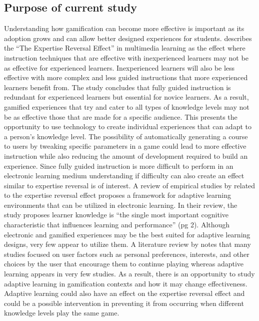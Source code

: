 \documentclass[letterpaper,man,natbib,floatsintext]{apa7}  %
\begin{document}
\subsection{Purpose of current study}
Understanding how gamification can become more effective is important as its adoption grows and can allow better
designed experiences for students. \cite{kalyuga2009expertise} describes the ``The Expertise Reversal Effect'' in
multimedia learning as the effect where 
instruction techniques that are effective with inexperienced learners may not be as effective for experienced learners. 
Inexperienced learners will also be less effective with more complex and less guided instructions that more 
experienced learners benefit from. The study concludes that fully guided instruction is redundant for experienced learners but essential for novice learners. As a result, gamified experiences that try and cater to all types of knowledge levels
may not be as effective those that are made for a specific audience. This presents the opportunity to use technology to
create individual experiences that can adapt to a person's knowledge level. The possibility of automatically generating
a course to users by tweaking specific parameters in a game could lead to more effective instruction while also reducing
the amount of development required to build an experience. Since fully guided instruction is more difficult to perform in
an electronic learning medium understanding if difficulty can also create an effect similar to expertise reversal is of 
interest. A review of empirical studies by \cite{kalyuga2007expertise} related to the expertise reversal effect proposes a
framework for adaptive learning environments that can be utilized in electronic learning. In their review, the study proposes learner knowledge is ``the single most important cognitive characteristic that influences learning and 
performance'' (pg 2). Although electronic and gamified experiences may be the best suited for adaptive learning 
designs, very few appear to utilize them. A literature review by \cite{majuri2018gamification} notes that many studies
focused on user factors such as personal preferences, interests, and other choices by the user that encourage them
to continue playing whereas adaptive learning appears in very few studies. As a result, there is an opportunity to
study adaptive learning in gamification contexts and how it may change effectiveness. Adaptive learning could
also have an effect on the expertise reversal effect and could be a possible intervention in preventing it from occurring
when different knowledge levels play the same game.
\end{document}
